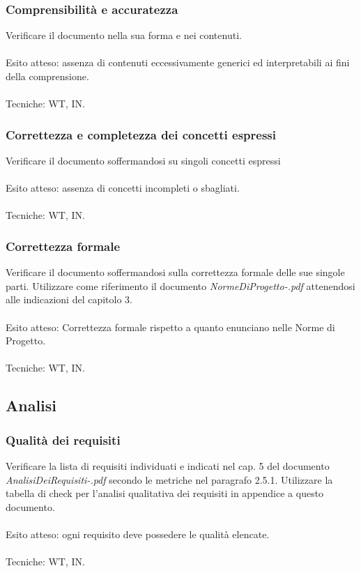 \subsubsection{Comprensibilit\`a e accuratezza}

Verificare il documento nella sua forma e nei contenuti.
\\\\
Esito atteso: assenza di contenuti eccessivamente generici ed interpretabili ai
fini della comprensione.
\\\\
Tecniche: WT, IN.

\subsubsection{Correttezza e completezza dei concetti espressi}

Verificare il documento soffermandosi su singoli concetti espressi
\\\\
Esito atteso: assenza di concetti incompleti o sbagliati.
\\\\
Tecniche: WT, IN.

\subsubsection{Correttezza formale}

Verificare il documento soffermandosi sulla correttezza formale delle sue 
singole parti. Utilizzare come riferimento il documento
\emph{NormeDiProgetto-\versionenormeprogetto.pdf} attenendosi alle indicazioni del capitolo 3.
\\\\
Esito atteso: Correttezza formale rispetto a quanto enunciano nelle Norme di
Progetto.
\\\\
Tecniche: WT, IN.


\subsection{Analisi}

\subsubsection{Qualit\`a dei requisiti}

Verificare la lista di requisiti individuati e indicati nel cap. 5 del documento
\emph{AnalisiDeiRequisiti-\versioneAR.pdf} secondo le metriche nel paragrafo 2.5.1.
Utilizzare la tabella di check per l'analisi qualitativa dei requisiti in
appendice a questo documento.
\\\\
Esito atteso: ogni requisito deve possedere le qualit\`a elencate.
\\\\
Tecniche: WT, IN.


